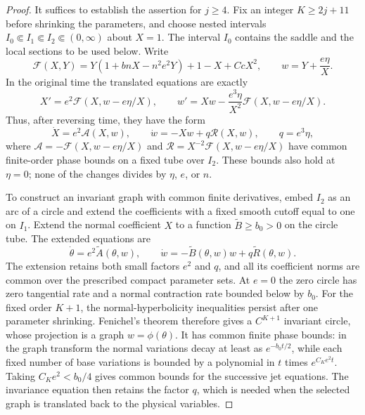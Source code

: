 \begin{proof}
It suffices to establish the assertion for $j\ge4$. Fix an integer
$K\ge2j+11$ before shrinking the parameters, and choose nested intervals
$I_0\Subset I_1\Subset I_2\Subset(0,\infty)$ about $X=1$.
The interval $I_0$ contains the saddle and the local sections to be used
below. Write
\[
 \mathcal F(X,Y)=Y(1+bnX-n^2e^2Y)+1-X+CcX^2,
 \qquad w=Y+\frac{e\eta}{X}.
\]
In the original time the translated equations are exactly
\[
 X'=e^2\mathcal F(X,w-e\eta/X),\qquad
 w'=Xw-\frac{e^3\eta}{X^2}\mathcal F(X,w-e\eta/X).
\]
Thus, after reversing time, they have the form
\begin{equation}\label{eq:small-ratio-translated}
 \dot X=e^2\mathcal A(X,w),\qquad
 \dot w=-Xw+q\mathcal R(X,w),\qquad q=e^3\eta,
\end{equation}
where $\mathcal A=-\mathcal F(X,w-e\eta/X)$ and
$\mathcal R=X^{-2}\mathcal F(X,w-e\eta/X)$ have common finite-order
phase bounds on a fixed tube over $I_2$. These bounds also hold at
$\eta=0$; none of the changes divides by $\eta$, $e$, or $n$.

To construct an invariant graph with common finite derivatives, embed
$I_2$ as an arc of a circle and extend the coefficients with a
fixed smooth cutoff equal to one on $I_1$. Extend the normal coefficient
$X$ to a function $\widetilde B\ge b_0>0$ on the circle tube.
The extended equations are
\[
 \dot\theta=e^2\widetilde A(\theta,w),\qquad
 \dot w=-\widetilde B(\theta,w)w
                 +q\widetilde R(\theta,w).
\]
The extension retains both small factors $e^2$ and $q$, and all its
coefficient norms are common over the prescribed compact parameter
sets. At $e=0$ the zero circle has zero tangential rate and a normal
contraction rate bounded below by $b_0$. For the fixed order $K+1$,
the normal-hyperbolicity inequalities persist after one parameter
shrinking. Fenichel's theorem
\cite[Theorem~3, p.~215]{Fenichel1971} therefore gives a $C^{K+1}$
invariant circle, whose projection is a graph $w=\phi(\theta)$.
It has common finite phase bounds: in the graph transform the normal
variations decay at least as $e^{-b_0t/2}$, while each fixed number
of base variations is bounded by a polynomial in $t$ times
$e^{C_Ke^2t}$. Taking $C_Ke^2<b_0/4$ gives common bounds for the
successive jet equations. The invariance equation then retains the
factor $q$, which is needed when the selected graph is translated back
to the physical variables.


\end{proof}
